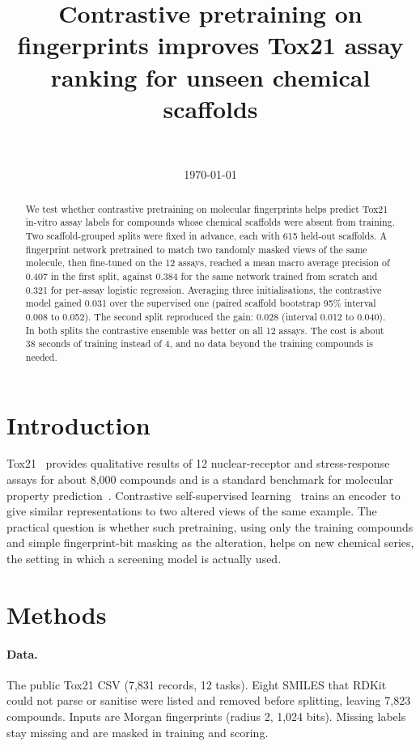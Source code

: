 \documentclass[11pt]{article}
\title{Contrastive pretraining on fingerprints improves Tox21 assay\\ ranking for unseen chemical scaffolds}
\author{\authorname\\ \small \affiliation}
\date{\today}
\begin{document}
\maketitle

\begin{abstract}
We test whether contrastive pretraining on molecular fingerprints helps predict Tox21 in-vitro assay labels for
compounds whose chemical scaffolds were absent from training. Two scaffold-grouped splits were fixed in advance,
each with 615 held-out scaffolds. A fingerprint network pretrained to match two randomly masked views of the same
molecule, then fine-tuned on the 12 assays, reached a mean macro average precision of 0.407 in the first split,
against 0.384 for the same network trained from scratch and 0.321 for per-assay logistic regression. Averaging three
initialisations, the contrastive model gained 0.031 over the supervised one (paired scaffold bootstrap 95\% interval
0.008 to 0.052). The second split reproduced the gain: 0.028 (interval 0.012 to 0.040). In both splits the
contrastive ensemble was better on all 12 assays. The cost is about 38 seconds of training instead of 4, and no data
beyond the training compounds is needed.
\end{abstract}

\section{Introduction}
Tox21~\cite{tox21} provides qualitative results of 12 nuclear-receptor and stress-response assays for about 8,000
compounds and is a standard benchmark for molecular property prediction~\cite{moleculenet}. Contrastive
self-supervised learning~\cite{simclr} trains an encoder to give similar representations to two altered views of
the same example. The practical question is whether such pretraining, using only the training compounds and simple
fingerprint-bit masking as the alteration, helps on new chemical series, the setting in which a screening model is
actually used.

\section{Methods}
\paragraph{Data.} The public Tox21 CSV (7,831 records, 12 tasks). Eight SMILES that RDKit could not parse or sanitise
were listed and removed before splitting, leaving 7,823 compounds. Inputs are Morgan fingerprints (radius 2, 1,024
bits). Missing labels stay missing and are masked in training and scoring.
\end{document}
